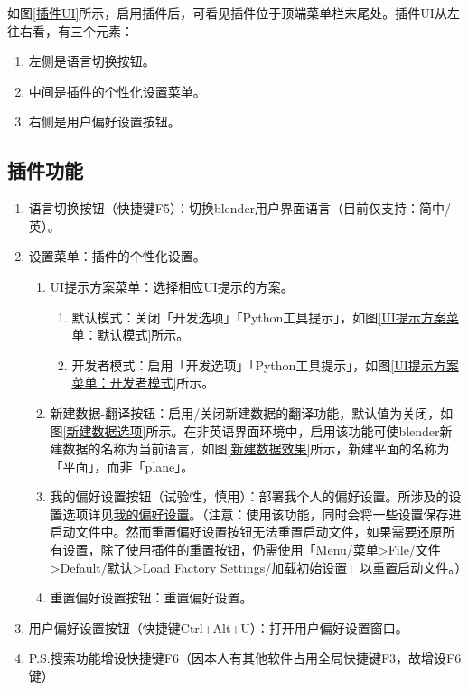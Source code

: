 \documentclass{../../PublicResources/DocClass}
\begin{document}
    如图\ref{插件UI}所示，启用插件后，可看见插件位于顶端菜单栏末尾处。插件UI从左往右看，有三个元素：
    \begin{enumerate}
        \item 左侧是语言切换按钮。
        \item 中间是插件的个性化设置菜单。
        \item 右侧是用户偏好设置按钮。
    \end{enumerate}

    \subsection{插件功能}
    \hypertarget{AddonFeatures}{}
    \begin{enumerate}
        \item 语言切换按钮（快捷键F5）：切换blender用户界面语言（目前仅支持：简中/英）。
        \item 设置菜单：插件的个性化设置。
        \begin{enumerate}
            \item UI提示方案菜单：选择相应UI提示的方案。
            \begin{enumerate}
                \item 默认模式：关闭「开发选项」「Python工具提示」，如图\ref{UI提示方案菜单：默认模式}所示。
                \item 开发者模式：启用「开发选项」「Python工具提示」，如图\ref{UI提示方案菜单：开发者模式}所示。
            \end{enumerate}
            \item 新建数据-翻译按钮：启用/关闭新建数据的翻译功能，默认值为关闭，如图\ref{新建数据选项}所示。在非英语界面环境中，启用该功能可使blender新建数据的名称为当前语言，如图\ref{新建数据效果}所示，新建平面的名称为「平面」，而非「plane」。
            \item 我的偏好设置按钮（{\color{red}试验性，慎用}）：部署我个人的偏好设置。所涉及的设置选项详见\hyperlink{MyPreferences}{我的偏好设置}。（注意：使用该功能，同时会将一些设置保存进启动文件中。然而重置偏好设置按钮无法重置启动文件，如果需要还原所有设置，除了使用插件的重置按钮，仍需使用「Menu/菜单>File/文件>Default/默认>Load Factory Settings/加载初始设置」以重置启动文件。）
            \item 重置偏好设置按钮：重置偏好设置。
        \end{enumerate}
        \item 用户偏好设置按钮（快捷键Ctrl+Alt+U）：打开用户偏好设置窗口。
        \item P.S.搜索功能增设快捷键F6（因本人有其他软件占用全局快捷键F3，故增设F6键）
    \end{enumerate}
\end{document}
